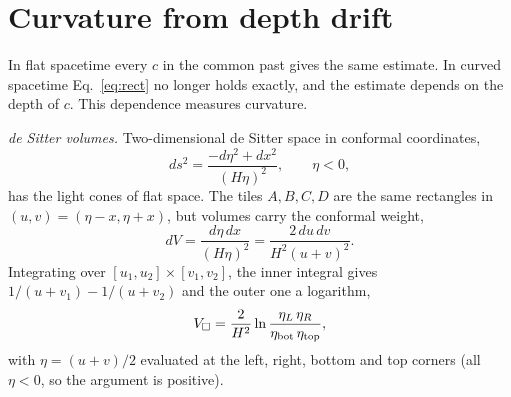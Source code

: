 \documentclass[prd,twocolumn,superscriptaddress,nofootinbib,amsmath,amssymb,floatfix]{revtex4-2}
\begin{document}
\section{Curvature from depth drift}\label{sec:curv}
In flat spacetime every $c$ in the common past gives the same estimate. In curved spacetime Eq.~\eqref{eq:rect} no longer holds exactly, and the estimate depends on the depth of $c$. This dependence measures curvature.

\emph{de Sitter volumes.} Two-dimensional de Sitter space in conformal coordinates,
\begin{equation}
ds^2=\frac{-d\eta^2+dx^2}{(H\eta)^2},\qquad\eta<0,
\end{equation}
has the light cones of flat space. The tiles $A,B,C,D$ are the same rectangles in $(u,v)=(\eta-x,\eta+x)$, but volumes carry the conformal weight,
\begin{equation}
dV=\frac{d\eta\,dx}{(H\eta)^2}=\frac{2\,du\,dv}{H^2(u+v)^2}.
\end{equation}
Integrating over $[u_1,u_2]\times[v_1,v_2]$, the inner integral gives $1/(u+v_1)-1/(u+v_2)$ and the outer one a logarithm,
\begin{equation}
V_\square=\frac{2}{H^2}\ln\frac{\eta_L\,\eta_R}{\eta_{\rm bot}\,\eta_{\rm top}},
\label{eq:dsvol}
\end{equation}
with $\eta=(u+v)/2$ evaluated at the left, right, bottom and top corners (all $\eta<0$, so the argument is positive).
\end{document}
